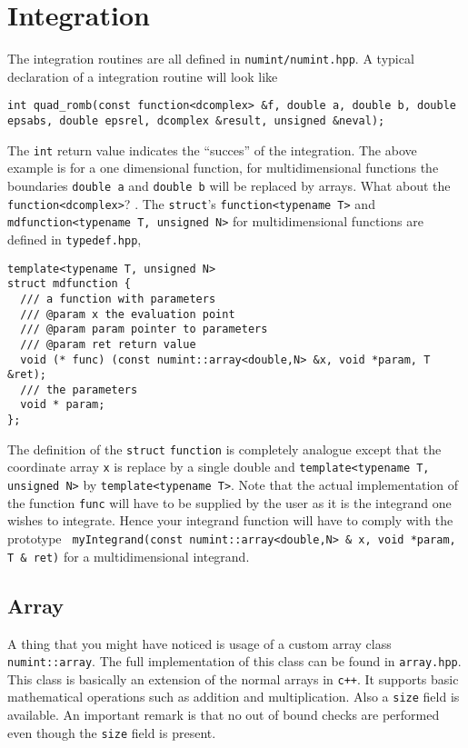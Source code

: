 
\section{Integration}

The integration routines are all defined in \texttt{numint/numint.hpp}. A typical declaration of a integration routine will look like
\begin{lstlisting}
int quad_romb(const function<dcomplex> &f, double a, double b, double epsabs, double epsrel, dcomplex &result, unsigned &neval);
\end{lstlisting}
The \texttt{int} return value indicates the ``succes'' of the integration. The above example is for a one dimensional function, for multidimensional functions the boundaries \texttt{double a} and \texttt{double b} will be replaced by arrays. What about the \texttt{function<dcomplex>}? . The \texttt{struct}'s \texttt{function<typename T>} and \texttt{mdfunction<typename T, unsigned N>} for multidimensional functions are defined in \texttt{typedef.hpp},
\begin{lstlisting}
template<typename T, unsigned N>
struct mdfunction {
  /// a function with parameters
  /// @param x the evaluation point
  /// @param param pointer to parameters
  /// @param ret return value
  void (* func) (const numint::array<double,N> &x, void *param, T &ret);
  /// the parameters
  void * param;
};
\end{lstlisting}
The definition of the \texttt{struct} \texttt{function} is completely analogue except that the coordinate array \texttt{x} is replace by a single double and \texttt{template<typename T, unsigned N>} by \texttt{template<typename T>}. Note that the actual implementation of the function \texttt{func} will have to be supplied by the user as it is the integrand one wishes to integrate. Hence your integrand function will have to comply with the prototype \texttt{ myIntegrand(const numint::array<double,N> \& x, void *param, T \& ret)} for a multidimensional integrand.
\subsection{Array}
A thing that you might have noticed is usage of a custom array class \texttt{numint::array}. The full implementation of this class can be found in \texttt{array.hpp}. This class is basically an extension of the normal arrays in \texttt{c++}. It supports basic mathematical operations such as addition and multiplication. Also a \texttt{size} field is available. An important remark is that no out of bound checks are performed even though the \texttt{size} field is present.